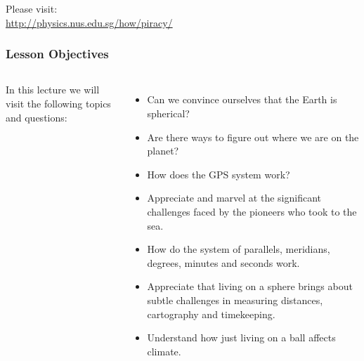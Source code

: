 {
\begin{frame}
\maketitle

\begin{center}
	\small Please visit:\\
	\url{http://physics.nus.edu.sg/how/piracy/}
\end{center}
\end{frame}
}
\begin{frame}
\frametitle{Lesson Objectives}
\begin{columns}
	In this lecture we will visit the following topics and questions:
	\begin{itemize}
		\item Can we convince ourselves that the Earth is spherical?
		\item Are there ways to figure out where we are on the planet?
		\item How does the GPS system work?
		\item Appreciate and marvel at the significant challenges faced by the pioneers who took to the sea.
		\item How do the system of parallels, meridians, degrees, minutes and seconds work.
		\item Appreciate that living on a sphere brings about subtle challenges in measuring distances, cartography and timekeeping.
		\item Understand how just living on a ball affects climate.
	\end{itemize}
\end{columns}
\end{frame}

